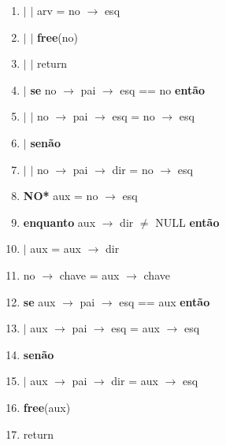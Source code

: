 \begin{itemize}
\begin{itemize}
\begin{enumerate}[1--]
			\item $|$
			\quad $|$ 
			\quad arv = no $\rightarrow$ esq
			\item $|$
			\quad $|$
			\quad \textbf{free}(no)
			\item $|$
			\quad $|$
			\quad return
			\item $|$
			\quad \textbf{se} no $\rightarrow$ pai $\rightarrow$ esq == no \textbf{então}
			\item $|$
			\quad $|$
			\quad no $\rightarrow$ pai $\rightarrow$ esq = no $\rightarrow$ esq
			\item $|$
			\quad \textbf{senão}
			\item $|$
			\quad $|$
			\quad no $\rightarrow$ pai $\rightarrow$ dir = no $\rightarrow$ esq
			\item \textbf{NO*} aux = no $\rightarrow$ esq
			\item \textbf{enquanto} aux $\rightarrow$ dir $\neq$ NULL \textbf{então}
			\item $|$ 
			\quad aux = aux $\rightarrow$ dir
			\item no $\rightarrow$ chave = aux $\rightarrow$ chave
			\item \textbf{se} aux $\rightarrow$ pai $\rightarrow$ esq == aux \textbf{então}
			\item $|$
			\quad aux $\rightarrow$ pai $\rightarrow$ esq = aux $\rightarrow$ esq
			\item \textbf{senão}
			\item $|$
			\quad aux $\rightarrow$ pai $\rightarrow$ dir = aux $\rightarrow$ esq
			\item \textbf{free}(aux)
			\item return
			
			
		\end{enumerate}
	\end{itemize}
\end{itemize}